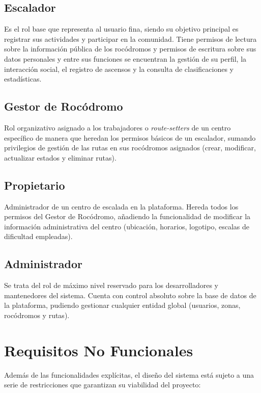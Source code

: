 \subsection{Escalador}
Es el rol base que representa al usuario fina, siendo su objetivo principal es registrar sus actividades y participar en la comunidad. Tiene permisos de lectura sobre la información pública de los rocódromos y permisos de escritura sobre sus datos personales y entre sus funciones se encuentran la gestión de su perfil, la interacción social, el registro de ascensos y la consulta de clasificaciones y estadísticas.

\subsection{Gestor de Rocódromo}
Rol organizativo asignado a los trabajadores o \textit{route-setters} de un centro específico de manera que heredan los permisos básicos de un escalador, sumando privilegios de gestión de las rutas en sus rocódromos asignados (crear, modificar, actualizar estados y eliminar rutas).

\subsection{Propietario}
Administrador de un centro de escalada en la plataforma. Hereda todos los permisos del Gestor de Rocódromo, añadiendo la funcionalidad de modificar la información administrativa del centro (ubicación, horarios, logotipo, escalas de dificultad empleadas).

\subsection{Administrador}
Se trata del rol de máximo nivel reservado para los desarrolladores y mantenedores del sistema. Cuenta con control absoluto sobre la base de datos de la plataforma, pudiendo gestionar cualquier entidad global (usuarios, zonas, rocódromos y rutas).

\section{Requisitos No Funcionales}

Además de las funcionalidades explícitas, el diseño del sistema está sujeto a una serie de restricciones que garantizan su viabilidad del proyecto:

